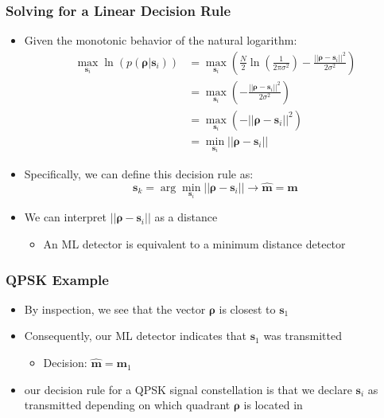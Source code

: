 \documentclass[10pt]{beamer}
\begin{document}
\frame
{
  \frametitle{Solving for a Linear Decision Rule}

    \begin{itemize}
        \item Given the monotonic behavior of the natural logarithm:
        \begin{equation}
        \begin{split}
            \max\limits_{\mathbf{s}_i}\ln(p(\mathbf{\rho}|\mathbf{s}_i))&=\max\limits_{\mathbf{s}_i}\left(\frac{N}{2}\ln\left(\frac{1}{2\pi\sigma^2}\right)-\frac{||\mathbf{\rho}-\mathbf{s}_i||^2}{2\sigma^2}\right)\\
            &=\max\limits_{\mathbf{s}_i}\left(-\frac{||\mathbf{\rho}-\mathbf{s}_i||^2}{2\sigma^2}\right)\\
            &=\max\limits_{\mathbf{s}_i}\left(-||\mathbf{\rho}-\mathbf{s}_i||^2\right)\\
            &=\min\limits_{\mathbf{s}_i}||\mathbf{\rho}-\mathbf{s}_i||\nonumber
        \end{split}
        \end{equation}
        \item Specifically, we can define this decision rule as:
        \begin{equation}
            \mathbf{s}_k=\arg\min\limits_{\mathbf{s}_i}||\mathbf{\rho}-\mathbf{s}_i||\rightarrow\hat{\mathbf{m}}=\mathbf{m}\nonumber
        \end{equation}
        \item We can interpret $||\mathbf{\rho}-\mathbf{s}_i||$ as a distance
        \begin{itemize}
            \item An ML detector is equivalent to a minimum distance detector
        \end{itemize}
    \end{itemize}

}

\frame
{
  \frametitle{QPSK Example}

  \begin{itemize}
     \item By inspection, we see that the vector $\mathbf{\rho}$ is closest to $\mathbf{s}_1$
     \item Consequently, our ML detector indicates that $\mathbf{s}_1$ was transmitted
     \begin{itemize}
        \item Decision: $\hat{\mathbf{m}}=\mathbf{m}_1$
     \end{itemize}
     \item our decision rule for a QPSK signal constellation is that we declare $\mathbf{s}_i$ as transmitted depending on which quadrant $\mathbf{\rho}$ is located in
  \end{itemize}

}
\end{document}
